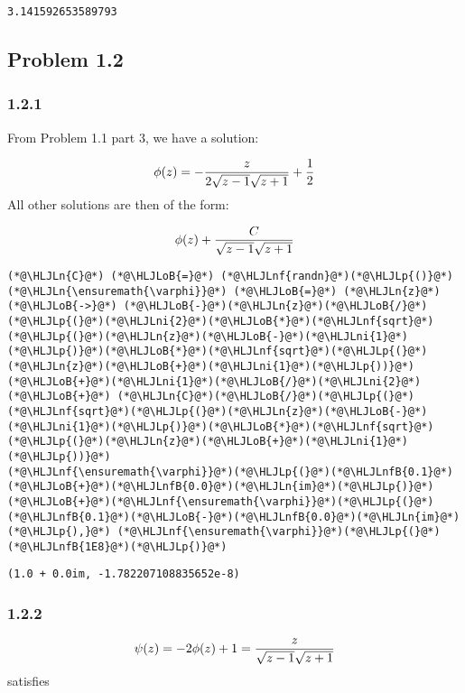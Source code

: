 \documentclass[12pt,landscape]{article}
\newcommand{\HLJLn}[1]{#1}
\newcommand{\HLJLnf}[1]{\textcolor[RGB]{66,102,213}{#1}}
\newcommand{\HLJLnfB}[1]{\textcolor[RGB]{59,151,46}{#1}}
\newcommand{\HLJLni}[1]{\textcolor[RGB]{59,151,46}{#1}}
\newcommand{\HLJLoB}[1]{\textcolor[RGB]{102,102,102}{\textbf{#1}}}
\newcommand{\HLJLp}[1]{#1}
\begin{document}
{\begin{lstlisting}
3.141592653589793
\end{lstlisting}


\subsection{Problem 1.2}
\subsubsection{1.2.1}
From Problem 1.1 part 3, we have a solution:

\[
\phi(z) = -{ z  \over 2 \sqrt{z -1} \sqrt{z+1}} + {1 \over 2}
\]
All other solutions are then of the form:

\[
\phi(z) + {C \over \sqrt{z-1} \sqrt{z+1}}
\]

\begin{lstlisting}
(*@\HLJLn{C}@*) (*@\HLJLoB{=}@*) (*@\HLJLnf{randn}@*)(*@\HLJLp{()}@*)
(*@\HLJLn{\ensuremath{\varphi}}@*) (*@\HLJLoB{=}@*) (*@\HLJLn{z}@*) (*@\HLJLoB{->}@*) (*@\HLJLoB{-}@*)(*@\HLJLn{z}@*)(*@\HLJLoB{/}@*)(*@\HLJLp{(}@*)(*@\HLJLni{2}@*)(*@\HLJLoB{*}@*)(*@\HLJLnf{sqrt}@*)(*@\HLJLp{(}@*)(*@\HLJLn{z}@*)(*@\HLJLoB{-}@*)(*@\HLJLni{1}@*)(*@\HLJLp{)}@*)(*@\HLJLoB{*}@*)(*@\HLJLnf{sqrt}@*)(*@\HLJLp{(}@*)(*@\HLJLn{z}@*)(*@\HLJLoB{+}@*)(*@\HLJLni{1}@*)(*@\HLJLp{))}@*)(*@\HLJLoB{+}@*)(*@\HLJLni{1}@*)(*@\HLJLoB{/}@*)(*@\HLJLni{2}@*) (*@\HLJLoB{+}@*) (*@\HLJLn{C}@*)(*@\HLJLoB{/}@*)(*@\HLJLp{(}@*)(*@\HLJLnf{sqrt}@*)(*@\HLJLp{(}@*)(*@\HLJLn{z}@*)(*@\HLJLoB{-}@*)(*@\HLJLni{1}@*)(*@\HLJLp{)}@*)(*@\HLJLoB{*}@*)(*@\HLJLnf{sqrt}@*)(*@\HLJLp{(}@*)(*@\HLJLn{z}@*)(*@\HLJLoB{+}@*)(*@\HLJLni{1}@*)(*@\HLJLp{))}@*)
(*@\HLJLnf{\ensuremath{\varphi}}@*)(*@\HLJLp{(}@*)(*@\HLJLnfB{0.1}@*)(*@\HLJLoB{+}@*)(*@\HLJLnfB{0.0}@*)(*@\HLJLn{im}@*)(*@\HLJLp{)}@*)(*@\HLJLoB{+}@*)(*@\HLJLnf{\ensuremath{\varphi}}@*)(*@\HLJLp{(}@*)(*@\HLJLnfB{0.1}@*)(*@\HLJLoB{-}@*)(*@\HLJLnfB{0.0}@*)(*@\HLJLn{im}@*)(*@\HLJLp{),}@*) (*@\HLJLnf{\ensuremath{\varphi}}@*)(*@\HLJLp{(}@*)(*@\HLJLnfB{1E8}@*)(*@\HLJLp{)}@*)
\end{lstlisting}

\begin{lstlisting}
(1.0 + 0.0im, -1.782207108835652e-8)
\end{lstlisting}


\subsubsection{1.2.2}
\[
\psi(z) = -2\phi(z) + 1 = { z  \over  \sqrt{z -1} \sqrt{z+1}}
\]
satisfies

}
\end{document}
